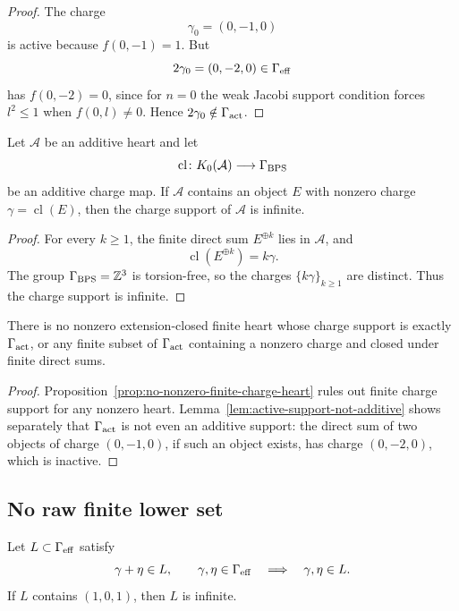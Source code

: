 \begin{proof}
The charge
\[
  \gamma_0=(0,-1,0)
\]
is active because \(f(0,-1)=1\).  But
\[
  2\gamma_0=(0,-2,0)\in\Gamma_{\mathrm{eff}}
\]
has \(f(0,-2)=0\), since for \(n=0\) the weak Jacobi support condition
forces \(l^2\le1\) when \(f(0,l)\ne0\).  Hence
\(2\gamma_0\notin\Gamma_{\mathrm{act}}\).
\end{proof}

\begin{proposition}
\label{prop:no-nonzero-finite-charge-heart}
Let \(\mathcal A\) be an additive heart and let
\[
  \operatorname{cl}\colon K_0(\mathcal A)\longrightarrow\Gamma_{\mathrm{BPS}}
  \]
be an additive charge map.  If \(\mathcal A\) contains an object
\(E\) with nonzero charge \(\gamma=\operatorname{cl}(E)\), then the
charge support of \(\mathcal A\) is infinite.
\end{proposition}

\begin{proof}
For every \(k\ge1\), the finite direct sum \(E^{\oplus k}\) lies in
\(\mathcal A\), and
\[
  \operatorname{cl}(E^{\oplus k})=k\gamma .
\]
The group \(\Gamma_{\mathrm{BPS}}=\mathbb Z^3\) is torsion-free, so the charges
\(\{k\gamma\}_{k\ge1}\) are distinct.  Thus the charge support is
infinite.
\end{proof}

\begin{corollary}
\label{cor:no-finite-active-heart}
There is no nonzero extension-closed finite heart whose charge support
is exactly \(\Gamma_{\mathrm{act}}\), or any finite subset of \(\Gamma_{\mathrm{act}}\) containing
a nonzero charge and closed under finite direct sums.
\end{corollary}

\begin{proof}
Proposition~\ref{prop:no-nonzero-finite-charge-heart} rules out finite
charge support for any nonzero heart.  Lemma~\ref{lem:active-support-not-additive}
shows separately that \(\Gamma_{\mathrm{act}}\) is not even an additive support:
the direct sum of two objects of charge \((0,-1,0)\), if such an object
exists, has charge \((0,-2,0)\), which is inactive.
\end{proof}

\subsection{No raw finite lower set}

\begin{lemma}
\label{lem:active-interior-infinite-lower-hull}
Let \(L\subset\Gamma_{\mathrm{eff}}\) satisfy
\[
  \gamma+\eta\in L,\qquad \gamma,\eta\in\Gamma_{\mathrm{eff}}
  \quad\Longrightarrow\quad \gamma,\eta\in L .
\]
If \(L\) contains \((1,0,1)\), then \(L\) is infinite.
\end{lemma}

